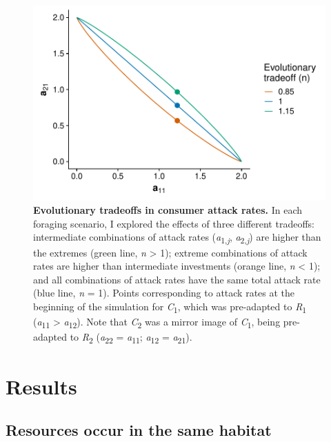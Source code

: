 \documentclass[11pt,]{article}
\begin{document}
\begin{figure}
\centering
\includegraphics{Fig_2_Tradeoffs.pdf}
\caption{\label{fig:tradeoff}\textbf{Evolutionary tradeoffs in consumer
attack rates.} In each foraging scenario, I explored the effects of
three different tradeoffs: intermediate combinations of attack rates
(\emph{a}\textsubscript{1,\emph{j}}, \emph{a}\textsubscript{2,\emph{j}})
are higher than the extremes (green line, \emph{n} \textgreater{} 1);
extreme combinations of attack rates are higher than intermediate
investments (orange line, \emph{n} \textless{} 1); and all combinations
of attack rates have the same total attack rate (blue line, \emph{n} =
1). Points corresponding to attack rates at the beginning of the
simulation for \emph{C}\textsubscript{1}, which was pre-adapted to
\emph{R}\textsubscript{1} (\emph{a}\textsubscript{11} \textgreater{}
\emph{a}\textsubscript{12}). Note that \emph{C}\textsubscript{2} was a
mirror image of \emph{C}\textsubscript{1}, being pre-adapted to
\emph{R}\textsubscript{2} (\emph{a}\textsubscript{22} =
\emph{a}\textsubscript{11}; \emph{a}\textsubscript{12} =
\emph{a}\textsubscript{21}).}
\end{figure}

\section{Results}\label{results}

\subsection{Resources occur in the same
habitat}\label{resources-occur-in-the-same-habitat}
\end{document}
